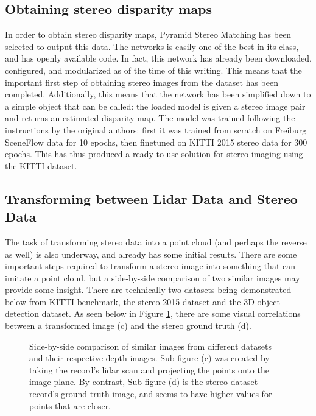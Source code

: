 \subsection{Obtaining stereo disparity maps}
In order to obtain stereo disparity maps, Pyramid Stereo Matching has been selected to output this data. The networks is easily one of the best in its class, and has openly available code. In fact, this network has already been downloaded, configured, and modularized as of the time of this writing. This means that the important first step of obtaining stereo images from the dataset has been completed. Additionally, this means that the network has been simplified down to a simple object that can be called: the loaded model is given a stereo image pair and returns an estimated disparity map. The model was trained following the instructions by the original authors: first it was trained from scratch on Freiburg SceneFlow data for 10 epochs, then finetuned on KITTI 2015 stereo data for 300 epochs. This has thus produced a ready-to-use solution for stereo imaging using the KITTI dataset. 

\subsection{Transforming between Lidar Data and Stereo Data}
The task of transforming stereo data into a point cloud (and perhaps the reverse as well) is also underway, and already has some initial results. There are some important steps required to transform a stereo image into something that can imitate a point cloud, but a side-by-side comparison of two similar images may provide some insight. There are technically two datasets being demonstrated below from KITTI benchmark, the stereo 2015 dataset and the 3D object detection dataset. As seen below in Figure \ref{stereo_comparison}, there are some visual correlations between a transformed image (c) and the stereo ground truth (d).


\begin{figure}[ht]
    \centering  
    \label{stereo_comparison}
    \caption{Side-by-side comparison of similar images from different datasets and their respective depth images. Sub-figure (c) was created by taking the record's lidar scan and projecting the points onto the image plane. By contrast, Sub-figure (d) is the stereo dataset record's ground truth image, and seems to have higher values for points that are closer. }
\end{figure}

